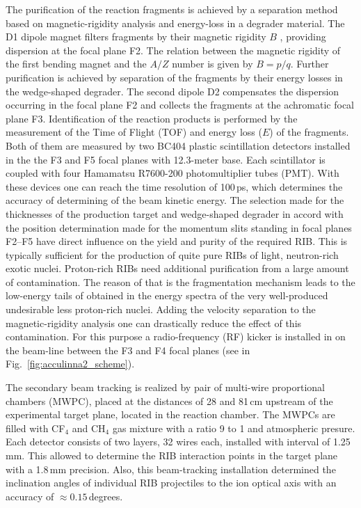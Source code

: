 The purification of the reaction fragments is achieved by a separation method based on magnetic-rigidity analysis and energy-loss in a degrader material. 
The D1 dipole magnet filters fragments by their magnetic rigidity $B$ , providing dispersion at the focal plane F2. 
The relation between the magnetic rigidity of the first bending magnet and the $A/Z$ number is given by $B=p/q$. 
Further purification is achieved by separation of the fragments by their energy losses in the wedge-shaped degrader. 
The second dipole D2 compensates the dispersion occurring in the focal plane F2 and collects the fragments at the achromatic focal plane F3. 
Identification of the reaction products is performed by the measurement of the Time of Flight (TOF) and energy
loss ($E$) of the fragments.
Both of them are measured by two BC404 plastic scintillation detectors installed in the the F3 and F5 focal planes with 12.3-meter base. 
Each scintillator is coupled with four Hamamatsu R7600-200 photomultiplier tubes (PMT). 
With these devices one can reach the time resolution of 100\,ps, which determines the accuracy of determining of the beam kinetic energy.
The selection made for the thicknesses of the production target and wedge-shaped degrader in accord with the position determination made for the momentum slits standing in focal planes F2–F5 have direct influence on the yield and purity of the required RIB.
This is typically sufficient for the production of quite pure RIBs of light, neutron-rich exotic nuclei. Proton-rich RIBs need additional purification from a large amount of contamination. 
The reason of that is the fragmentation mechanism leads to the low-energy tails of obtained in the energy spectra of the very well-produced undesirable less proton-rich nuclei. 
Adding the velocity separation to the magnetic-rigidity analysis one can drastically reduce the effect of this contamination. 
For this purpose a radio-frequency (RF) kicker is installed in on the beam-line between the F3 and F4 focal planes (see in Fig.\ \ref{fig:acculinna2_scheme}). 

The secondary beam tracking is realized by pair of multi-wire proportional chambers (MWPC), placed at the distances of 28 and 81\,cm upstream of the experimental target plane, located in the reaction chamber.
The MWPCs are filled with CF$_{4}$ and CH$_{4}$ gas mixture with a ratio 9 to 1 and atmospheric presure.
Each detector consists of two layers, 32 wires each, installed with interval of 1.25\,mm. 
This allowed to determine the RIB interaction points in the target plane with a 1.8\,mm  precision.
Also, this beam-tracking installation determined the inclination angles of individual RIB projectiles to the ion optical axis with an accuracy of $\approx 0.15 $\,degrees.


